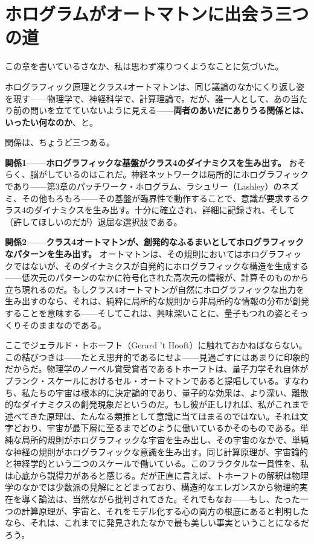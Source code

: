 \documentclass[11pt, twoside, openright]{book}
\begin{document}
\section*{ホログラムがオートマトンに出会う三つの道}

この章を書いているさなか、私は思わず凍りつくようなことに気づいた。

ホログラフィック原理とクラス4オートマトンは、同じ議論のなかにくり返し姿を現す------物理学で、神経科学で、計算理論で。だが、誰一人として、あの当たり前の問いを立てていないように見える------\textbf{両者のあいだにありうる関係とは、いったい何なのか}、と。

関係は、ちょうど三つある。

\textbf{関係1------ホログラフィックな基盤がクラス4のダイナミクスを生み出す。} おそらく、脳がしているのはこれだ。神経ネットワークは局所的にホログラフィックであり------第3章のパッチワーク・ホログラム、ラシュリー（Lashley）のネズミ、その他もろもろ------その基盤が臨界性で動作することで、意識が要求するクラス4のダイナミクスを生み出す。十分に確立され、詳細に記録され、そして（許してほしいのだが）退屈な選択肢である。

\textbf{関係2------クラス4オートマトンが、創発的なふるまいとしてホログラフィックなパターンを生み出す。} オートマトンは、その規則においてはホログラフィックではないが、そのダイナミクスが自発的にホログラフィックな構造を生成する------低次元のパターンのなかに符号化された高次元の情報が、計算そのものから立ち現れるのだ。もしクラス4オートマトンが自然にホログラフィックな出力を生み出すのなら、それは、純粋に局所的な規則から非局所的な情報の分布が創発することを意味する------そしてこれは、興味深いことに、量子もつれの姿とそっくりそのままなのである。

ここでジェラルド・トホーフト（Gerard 't Hooft）に触れておかねばならない。この結びつきは------たとえ思弁的であるにせよ------見過ごすにはあまりに印象的だからだ。物理学のノーベル賞受賞者であるトホーフトは、量子力学それ自体がプランク・スケールにおけるセル・オートマトンであると提唱している。すなわち、私たちの宇宙は根本的に決定論的であり、量子的な効果は、より深い、離散的なダイナミクスの創発現象だというのだ。もし彼が正しければ、私がこれまで述べてきた原理は、たんなる類推として意識に当てはまるのではない。それは文字どおり、宇宙が最下層に至るまでどのように働いているかそのものである。単純な局所的規則がホログラフィックな宇宙を生み出し、その宇宙のなかで、単純な神経の規則がホログラフィックな意識を生み出す。同じ計算原理が、宇宙論的と神経学的という二つのスケールで働いている。このフラクタルな一貫性を、私は心底から説得力があると感じる。だが正直に言えば、トホーフトの解釈は物理学のなかでは少数派の見解にとどまっており、構造的なエレガンスから物理的実在を導く論法は、当然ながら批判されてきた。それでもなお------もし、たった一つの計算原理が、宇宙と、それをモデル化する心の両方の根底にあると判明したなら、それは、これまでに発見されたなかで最も美しい事実ということになるだろう。
\end{document}
